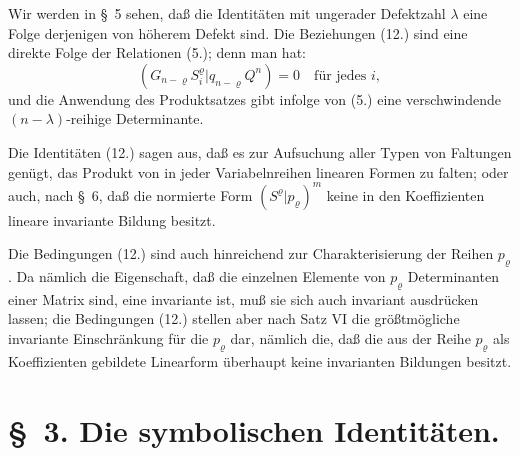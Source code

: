 \documentclass[12pt,a4paper]{article}
\begin{document}
Wir werden in \S\ 5 sehen, daß die Identitäten mit ungerader Defektzahl $\lambda$ eine Folge derjenigen von höherem Defekt sind. Die Beziehungen (12.) sind eine direkte Folge der Relationen (5.); denn man hat:
\begin{equation*}
(G_{n-\varrho} S^{\varrho}_{i} | q_{n-\varrho} Q^{n}) = 0 \quad \text{für jedes } i,
\end{equation*}
und die Anwendung des Produktsatzes gibt infolge von (5.) eine verschwindende $(n-\lambda)$-reihige Determinante.

Die Identitäten (12.) sagen aus, daß es zur Aufsuchung aller Typen von Faltungen genügt, das Produkt von in jeder Variabelnreihen linearen Formen zu falten; oder auch, nach \S\ 6, daß die normierte Form $(S^{\varrho} | p_{\varrho})^{m}$ keine in den Koeffizienten lineare invariante Bildung besitzt.

Die Bedingungen (12.) sind auch hinreichend zur Charakterisierung der Reihen $p_{\varrho}$. Da nämlich die Eigenschaft, daß die einzelnen Elemente von $p_{\varrho}$ Determinanten einer Matrix sind, eine invariante ist, muß sie sich auch invariant ausdrücken lassen; die Bedingungen (12.) stellen aber nach Satz VI die größtmögliche invariante Einschränkung für die $p_{\varrho}$ dar, nämlich die, daß die aus der Reihe $p_{\varrho}$ als Koeffizienten gebildete Linearform überhaupt keine invarianten Bildungen besitzt.


\section*{\S\ 3. Die symbolischen Identitäten.}
\end{document}
